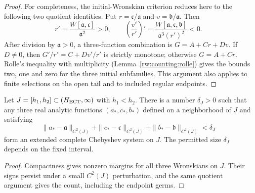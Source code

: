 \begin{proof}
For completeness, the initial-Wronskian criterion
\cite[Lemma~2.3(b)]{GMV2011} reduces here to the following two
quotient identities. Put $r=\mathfrak c/\mathfrak a$ and
$v=\mathfrak b/\mathfrak a$. Then
\[
 r'=\frac{W[\mathfrak a,\mathfrak c]}{\mathfrak a^2}>0,
 \qquad
 \left(\frac{v'}{r'}\right)'
   =\frac{W[\mathfrak a,\mathfrak c,\mathfrak b]}
          {\mathfrak a^3(r')^2}<0.
\]
After division by $\mathfrak a>0$, a three-function combination is
$G=A+Cr+Dv$. If $D\ne0$, then $G'/r'=C+Dv'/r'$ is strictly
monotone; otherwise $G=A+Cr$. Rolle's inequality with multiplicity
(Lemma~\ref{rw:counting:rolle}) gives the bounds two, one and zero
for the three initial subfamilies. This argument also applies to
finite selections on the open tail and to included regular endpoints.
\end{proof}

\begin{corollary}
\label{rw:base-ect-compact}
Let $J=[h_1,h_2]\subset(H_{\rm ECT},\infty)$ with $h_1<h_2$.
There is a number $\delta_J>0$ such that any three real analytic
functions $(a_*,c_*,b_*)$ defined on a neighborhood of $J$ and
satisfying
\[
 \|a_*-\mathfrak a\|_{C^2(J)}
 +\|c_*-\mathfrak c\|_{C^2(J)}
 +\|b_*-\mathfrak b\|_{C^2(J)}<\delta_J
\]
form an extended complete Chebyshev system on $J$. The permitted
size $\delta_J$ depends on the fixed interval.
\end{corollary}
\begin{proof}
Compactness gives nonzero margins for all three Wronskians on $J$.
Their signs persist under a small $C^2(J)$ perturbation, and the same
quotient argument gives the count, including the endpoint germs.
\end{proof}
